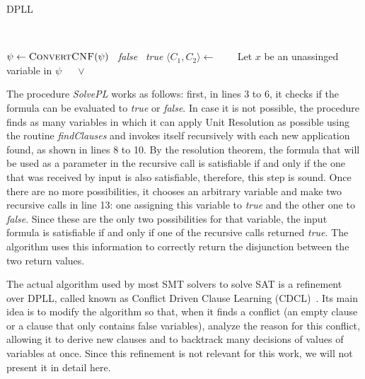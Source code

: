 \begin{algorithm}[H]
\caption{DPLL}~\label{dpllAlgo}
\begin{algorithmic}[1]
\State $\psi \gets \Call{ConvertCNF}{\psi}$
  \State \Return~\textit{false}
  \State \Return~\textit{true}
\Else
    \State $\langle C_{1}, C_{2} \rangle \gets$  
    \State~\Return~
  \Else
    \State~Let $x$ be an unassinged variable in $\psi$
    \State~\Return~ $\vee$ 
  \EndIf
\EndIf
\EndFunction
\end{algorithmic}
\end{algorithm}

The procedure \textit{SolvePL} works as follows: first, in lines 3 to 6, it checks if the formula can be evaluated to \textit{true} or \textit{false}. In case it is not possible, the procedure finds as many variables in which it can apply Unit Resolution as possible using the routine \textit{findClauses} and invokes itself recursively with each new application found, as shown in lines 8 to 10. By the resolution theorem, the formula that will be used as a parameter in the recursive call is satisfiable if and only if the one that was received by input is also satisfiable, therefore, this step is sound. Once there are no more possibilities, it chooses an arbitrary variable and make two recursive calls in line 13: one assigning this variable to \textit{true} and the other one to \textit{false}. Since these are the only two possibilities for that variable, the input formula is satisfiable if and only if one of the recursive calls returned \textit{true}. The algorithm uses this information to correctly return the disjunction between the two return values.

The actual algorithm used by most SMT solvers to solve SAT is a refinement over DPLL, called known as Conflict Driven Clause Learning (CDCL)~\cite{cdcl}. Its main idea is to modify the algorithm so that, when it finds a conflict (an empty clause or a clause that only contains false variables), analyze the reason for this conflict, allowing it to derive new clauses and to backtrack many decisions of values of variables at once. Since this refinement is not relevant for this work, we will not present it in detail here.

